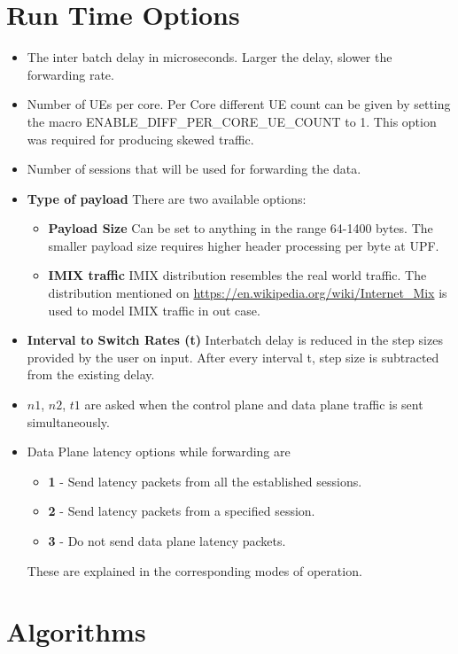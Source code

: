 \documentclass{article}
\begin{document}
\section{Run Time Options}
\begin{itemize}
    \item The inter batch delay in microseconds. Larger the delay, slower the forwarding rate.
    \item Number of UEs per core. Per Core different UE count can be given by setting the macro ENABLE\_DIFF\_PER\_CORE\_UE\_COUNT to 1. This option was required for producing skewed traffic.
    \item Number of sessions that will be used for forwarding the data.
    \item \textbf{Type of payload}
          There are two available options:
          \begin{itemize}
              \item \textbf{Payload Size} Can be set to anything in the range 64-1400 bytes. The smaller payload size requires higher header processing per byte at UPF.
              \item \textbf{IMIX traffic} IMIX distribution resembles the real world traffic. The distribution mentioned on \url{https://en.wikipedia.org/wiki/Internet_Mix} is used to model IMIX traffic in out case.
          \end{itemize}
    \item \textbf{Interval to Switch Rates (t)} Interbatch delay is reduced in the step sizes provided by the user on input.
          After every interval t, step size is subtracted from the existing delay.
    \item   $n1$, $n2$, $t1$ are asked when the control plane and data plane traffic is sent simultaneously.
\item Data Plane latency options while forwarding are
\begin{itemize}
    \item\textbf{1} - Send latency packets from all the established sessions.
    \item\textbf{2} - Send latency packets from a specified session.
    \item\textbf{3} - Do not send data plane latency packets.
\end{itemize}
          These are explained in the corresponding modes of operation.

\end{itemize}

\section{Algorithms}
\end{document}
